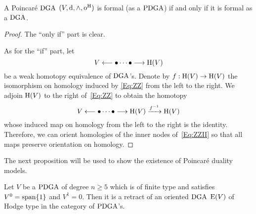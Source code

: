 \documentclass[\MainFolder/Text.tex]{subfiles}
\begin{document}
\begin{Proposition}\label{Prop:PoincModelOfFormal}
A Poincar\'e $\mathrm{DGA}$ $(V,\mathrm{d},\wedge,\mathrm{o}^{\mathrm{H}})$ is formal (as a $\mathrm{PDGA}$) if and only if it is formal as a $\mathrm{DGA}$.
\end{Proposition}
\begin{proof}
The ``only if'' part is clear.

As for the ``if'' part, let 
\begin{equation}\label{Eq:ZZ}
V \longleftarrow \bullet \dotsb \bullet \longrightarrow \mathrm{H}(V)
\end{equation}
be a weak homotopy equivalence of $\mathrm{DGA}$'s. Denote by $f: \mathrm{H}(V) \rightarrow \mathrm{H}(V)$ the isomorphism on homology induced by \eqref{Eq:ZZ} from the left to the right. We adjoin $\mathrm{H}(V)$ to the right of~\eqref{Eq:ZZ} to obtain the homotopy
\begin{equation}\label{Eq:ZZII}
V \longleftarrow \bullet \dotsb \bullet \longrightarrow \mathrm{H}(V) \xrightarrow{f^{-1}} \mathrm{H}(V)
\end{equation}
whose induced map on homology from the left to the right is the identity. Therefore, we can orient homologies of the inner nodes of~\eqref{Eq:ZZII} so that all maps preserve orientation on homology.
\end{proof}

The next proposition will be used to show the existence of Poincar\'e duality models.

\begin{Proposition}\label{Prop:ExtensionOfHodgeType}
Let $V$ be a $\mathrm{PDGA}$ of degree $n\ge 5$ which is of finite type and satisfies $V^0=\mathrm{span}\{1\}$ and $V^1 = 0$. Then it is a retract of an oriented $\mathrm{DGA}$ $\mathrm{E}(V)$ of Hodge type in the category of $\mathrm{PDGA}$'s.
\end{Proposition}
\end{document}
